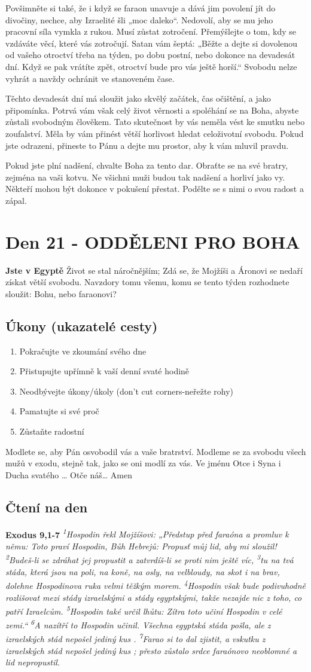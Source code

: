 \documentclass[11pt]{article}
\newcommand{\zacatekTretiTyden}{
  \textbf{Jste v Egyptě} \newline
  Život se stal náročnějším; Zdá se, že Mojžíši a Áronovi se nedaří získat větší svobodu. Navzdory tomu všemu,
komu se tento týden rozhodnete sloužit: Bohu, nebo faraonovi?

\subsection*{Úkony (ukazatelé cesty)}
\begin{enumerate}
  \item Pokračujte ve zkoumání svého dne
  \item Přistupujte upřímně k vaší denní svaté hodině
  \item Neodbývejte úkony/úkoly (don’t cut corners-neřežte rohy)
  \item Pamatujte si své proč
  \item Zůstaňte radostní
\end{enumerate}
Modlete se, aby Pán osvobodil vás a vaše bratrství. \newline
Modleme se za svobodu všech mužů v exodu, stejně tak, jako se oni modlí za vás.\newline
Ve jménu Otce i Syna i Ducha svatého …  Otče náš… Amen
}
\begin{document}
Povšimněte si také, že i když se faraon unavuje a dává jim povolení jít do divočiny, nechce, aby Izraelité
šli „moc daleko“. Nedovolí, aby se mu jeho pracovní síla vymkla z rukou. Musí zůstat zotročení.
Přemýšlejte o tom, kdy se vzdáváte věcí, které vás zotročují. Satan vám šeptá: „Běžte a dejte si dovolenou
od vašeho otroctví třeba na týden, po dobu postní, nebo dokonce na devadesát dní. Když se pak vrátíte
zpět, otroctví bude pro vás ještě horší.“ Svobodu nelze vyhrát a navždy ochránit ve stanoveném čase.

Těchto devadesát dní má sloužit jako skvělý začátek, čas očištění, a jako připomínka. Potrvá vám však
celý život věrnosti a spoléhání se na Boha, abyste zůstali svobodným člověkem.
Tato skutečnost by vás neměla vést ke smutku nebo zoufalství. Měla by vám přinést větší horlivost hledat
celoživotní svobodu. Pokud jste odrazeni, přineste to Pánu a dejte mu prostor, aby k vám mluvil pravdu.

Pokud jste plní nadšení, chvalte Boha za tento dar. Obraťte se na své bratry, zejména na vaši kotvu. Ne
všichni muži budou tak nadšení a horliví jako vy. Někteří mohou být dokonce v pokušení přestat. Podělte
se s nimi o svou radost a zápal.

\newpage
\section{Den 21 - ODDĚLENI PRO BOHA}
\zacatekTretiTyden
\subsection*{Čtení na den}
\textbf{Exodus 9,1-7}
\newline
\textit{
\textsuperscript{1}Hospodin řekl Mojžíšovi: „Předstup před faraóna a promluv k němu: Toto praví Hospodin, Bůh Hebrejů: Propusť můj lid, aby mi sloužil!
\textsuperscript{2}Budeš-li se zdráhat jej propustit a zatvrdíš-li se proti nim ještě víc,
\textsuperscript{3}tu na tvá stáda, která jsou na poli, na koně, na osly, na velbloudy, na skot i na brav, dolehne Hospodinova ruka velmi těžkým morem.
\textsuperscript{4}Hospodin však bude podivuhodně rozlišovat mezi stády izraelskými a stády egyptskými, takže nezajde nic z toho, co patří Izraelcům.
\textsuperscript{5}Hospodin také určil lhůtu: Zítra toto učiní Hospodin v celé zemi.“
\textsuperscript{6}A nazítří to Hospodin učinil. Všechna egyptská stáda pošla, ale z izraelských stád nepošel jediný kus .
\textsuperscript{7}Farao si to dal zjistit, a vskutku z izraelských stád nepošel jediný kus ; přesto zůstalo srdce faraónovo neoblomné a lid nepropustil.
}
\end{document}
